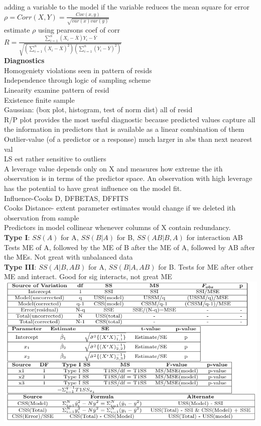 \documentclass[10pt,landscape]{article}
\newcommand{\sumn}{\sum_{i=1}^{n}}
\begin{document}
\begin{multicols*}{4}
adding a variable to the model if the variable reduces the mean square
for error\\
$\rho=Corr(X,Y)=\frac{Cov(x,y)}{\sqrt{var(x)var(y)}}$\\
estimate $\rho$ using pearsons coef of corr\\
$R=\frac{\sumn(X_i-\bar{X})Y_i-\bar{Y}}{\sqrt{(\sumn
(X_i-\bar{X})^2)(\sumn (Y_i-\bar{Y})^2)}}$\\
\textbf{Diagnostics}\\
Homogeniety violations seen in pattern of resids\\
Independence through logic of sampling scheme\\
Linearity examine pattern of resid\\
Existence finite sample\\
Gaussian: (box plot, histogram, test of norm dist) all of resid\\
R/P plot provides the most useful
diagnostic because predicted values capture all the information in predictors that is available as a linear combination of them\\
Outlier-value (of a predictor or a response) much larger in
abs than next nearest val\\
LS est rather sensitive to outliers\\
A leverage value depends only on X and measures how extreme the
ith observation is in terms of the predictor space. An observation with
high leverage has the potential to have great influence on the model fit.\\
Influence-Cooks D, DFBETAS, DFFITS\\
Cooks Distance- extent
parameter estimates would change if we deleted ith
observation from sample\\
Predictors in model collinear whenever columns of X contain
redundancy.\\
\textbf{Type I}: $SS(A)$ for A, $SS(B | A)$ for B,
$SS(AB | B, A)$ for interaction AB\\
Tests  ME of A, followed by the ME of B after the ME of A, followed by AB after the MEs. Not great with unbalanced data\\
\textbf{Type III}: $SS(A | B, AB)$ for A, $SS(B | A, AB)$ for B.
Tests for ME after other ME and interact. Good for sig interacts,
not great ME\\
\includegraphics[scale=.535]{ss2.png}\\

\end{multicols*}
\end{document}
